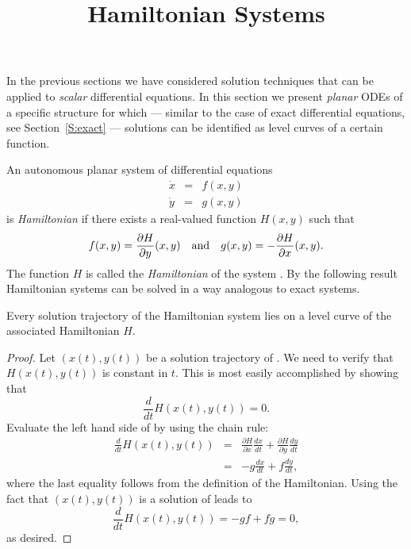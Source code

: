 \documentclass{ximera}
\title{Hamiltonian Systems}
\begin{document}
\begin{abstract}
\end{abstract}
\maketitle


\label{sec:HamSys}

In the previous sections we have considered solution techniques that
can be applied to {\em scalar\/} differential equations.  In this section 
we present {\em planar\/} ODEs of a specific structure for which 
--- similar to the case of exact differential equations, see 
Section~\ref{S:exact} --- solutions
can be identified as level curves of a certain function.

An autonomous planar system of differential equations 
\begin{equation}  \label{e:ham}
\begin{array}{rcl} 
\dot{x} & = & f(x,y) \\
\dot{y} & = & g(x,y) 
\end{array}
\end{equation}
is {\em Hamiltonian\/} if there exists a real-valued
function $H(x,y)$ such that 
\[
f(x,y) = \frac{\partial H}{\partial y}(x,y) \quad\mbox{and}\quad 
g(x,y) =-\frac{\partial H}{\partial x}(x,y).
\]
The function $H$ is called the {\em Hamiltonian\/}
of the system .
By the following result Hamiltonian systems can be solved in a way analogous 
to exact systems.

\begin{theorem}
Every solution trajectory of the Hamiltonian system  lies
on a level curve of the associated Hamiltonian $H$.
\end{theorem}

\begin{proof} 
Let $(x(t),y(t))$ be a solution trajectory of .  We need to 
verify that $H(x(t),y(t))$ is constant in $t$.  This is most easily 
accomplished by showing that 
\begin{equation} \label{e:dH=0}
\frac{d}{dt} H(x(t),y(t)) = 0.
\end{equation}
Evaluate the left hand side of  by using the chain rule:
\begin{eqnarray*}
\frac{d}{dt} H(x(t),y(t)) & = & \frac{\partial H}{\partial x}\frac{dx}{dt}
+ \frac{\partial H}{\partial y} \frac{dy}{dt} \\
& = & -g\frac{dx}{dt} + f\frac{dy}{dt}, 
\end{eqnarray*}
where the last equality follows from the definition of the Hamiltonian.  
Using the fact that $(x(t),y(t))$ is a solution of  leads to 
\[
 \frac{d}{dt} H(x(t),y(t)) = -gf+fg = 0,
\]
as desired.  \end{proof}
\end{document}
